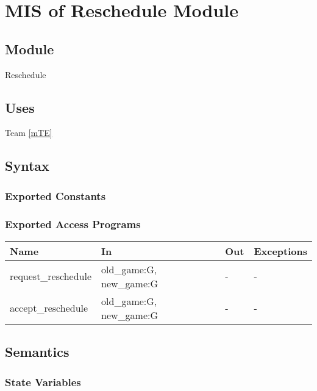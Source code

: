 \documentclass[12pt, titlepage]{article}
\begin{document}

\section{MIS of Reschedule Module} \label{mRE}

\subsection{Module}

Reschedule

\subsection{Uses}

Team \ref{mTE}

\subsection{Syntax}

\subsubsection{Exported Constants}

\subsubsection{Exported Access Programs}

\begin{center}
\begin{tabular}{p{5cm} p{4cm} p{4cm} p{2cm}}
\hline
\textbf{Name} & \textbf{In} & \textbf{Out} & \textbf{Exceptions} \\
\hline
request\_reschedule & old\_game:G, new\_game:G & - & - \\
accept\_reschedule & old\_game:G, new\_game:G & - & - \\
\hline
\end{tabular}
\end{center}

\subsection{Semantics}

\subsubsection{State Variables}
\end{document}
